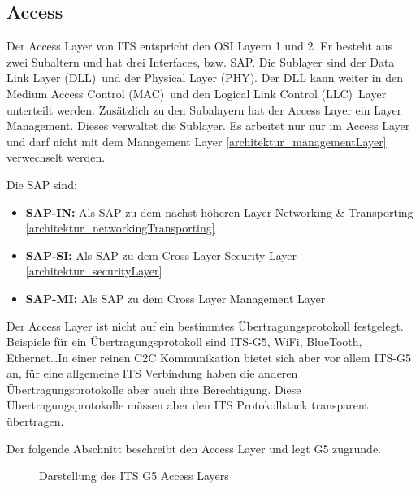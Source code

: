 \subsection{Access}
Der Access Layer von ITS entspricht den \ac{OSI} Layern 1 und 2. Er besteht aus zwei Subaltern und hat drei Interfaces, bzw. \ac{SAP}. Die Sublayer sind der \glqq Data Link Layer (DLL)\grqq~und der \glqq Physical Layer (PHY)\grqq. Der DLL kann weiter in den \glqq Medium Access Control (MAC)\grqq~und den \glqq Logical Link Control (LLC)\grqq~Layer unterteilt werden. Zusätzlich zu den Subalayern hat der Access Layer ein Layer Management. Dieses verwaltet die Sublayer. Es arbeitet nur nur im Access Layer und darf nicht mit dem  Management Layer \ref{architektur_managementLayer} verwechselt werden.

Die \ac{SAP} sind:
\begin{itemize}
	\item \textbf{SAP-IN: } Als \ac{SAP} zu dem nächst höheren Layer  Networking \& Transporting \ref{architektur_networkingTransporting}
	\item \textbf{SAP-SI: } Als \ac{SAP} zu dem Cross Layer Security Layer \ref{architektur_securityLayer}
	\item \textbf{SAP-MI: } Als \ac{SAP} zu dem Cross Layer Management Layer \label{architektur_managementLayer}
\end{itemize}


Der Access Layer ist nicht auf ein bestimmtes Übertragungsprotokoll festgelegt. Beispiele für ein Übertragungsprotokoll sind ITS-G5, WiFi, BlueTooth, Ethernet\dots In einer reinen \ac{C2C} Kommunikation bietet sich aber vor allem ITS-G5 an, für eine allgemeine \ac{ITS} Verbindung haben die anderen Übertragungsprotokolle aber auch ihre Berechtigung. Diese Übertragungsprotokolle müssen aber den \ac{ITS} Protokollstack transparent übertragen. 

Der folgende Abschnitt beschreibt den Access Layer und legt G5 zugrunde.
 
\begin{figure}
	\caption{Darstellung des ITS G5 Access Layers \cite{etsi302663}}
	\label{fig:architektur_accessLayer}
\end{figure}

